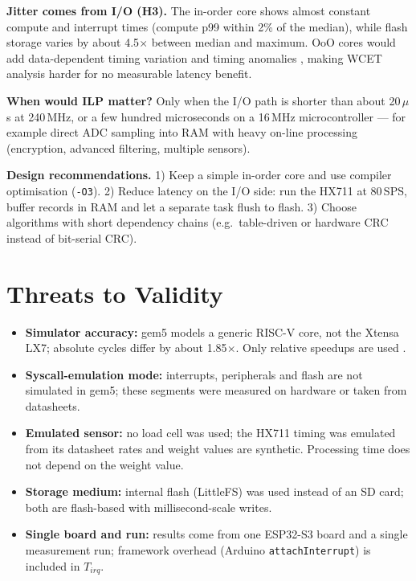 \documentclass[12pt, a4paper]{article}
\begin{document}
\vspace{0.2cm}
\noindent \textbf{Jitter comes from I/O (H3).} The in-order core shows almost constant compute and interrupt times (compute p99 within 2\% of the median), while flash storage varies by about 4.5$\times$ between median and maximum. OoO cores would add data-dependent timing variation and timing anomalies \cite{Lundqvist1999}, making WCET analysis harder \cite{Li2006, Wilhelm2008} for no measurable latency benefit.

\vspace{0.2cm}
\noindent \textbf{When would ILP matter?} Only when the I/O path is shorter than about 20\,$\mu$s at 240\,MHz, or a few hundred microseconds on a 16\,MHz microcontroller --- for example direct ADC sampling into RAM with heavy on-line processing (encryption, advanced filtering, multiple sensors).

\vspace{0.2cm}
\noindent \textbf{Design recommendations.} 1) Keep a simple in-order core and use compiler optimisation (\texttt{-O3}). 2) Reduce latency on the I/O side: run the HX711 at 80\,SPS, buffer records in RAM and let a separate task flush to flash. 3) Choose algorithms with short dependency chains (e.g.\ table-driven or hardware CRC instead of bit-serial CRC).

\section{Threats to Validity}
\begin{itemize}
    \item \textbf{Simulator accuracy:} gem5 models a generic RISC-V core, not the Xtensa LX7; absolute cycles differ by about 1.85$\times$. Only relative speedups are used \cite{Butko2012, Endo2014}.
    \item \textbf{Syscall-emulation mode:} interrupts, peripherals and flash are not simulated in gem5; these segments were measured on hardware or taken from datasheets.
    \item \textbf{Emulated sensor:} no load cell was used; the HX711 timing was emulated from its datasheet rates and weight values are synthetic. Processing time does not depend on the weight value.
    \item \textbf{Storage medium:} internal flash (LittleFS) was used instead of an SD card; both are flash-based with millisecond-scale writes.
    \item \textbf{Single board and run:} results come from one ESP32-S3 board and a single measurement run; framework overhead (Arduino \texttt{attachInterrupt}) is included in $T_{irq}$.
\end{itemize}
\end{document}

